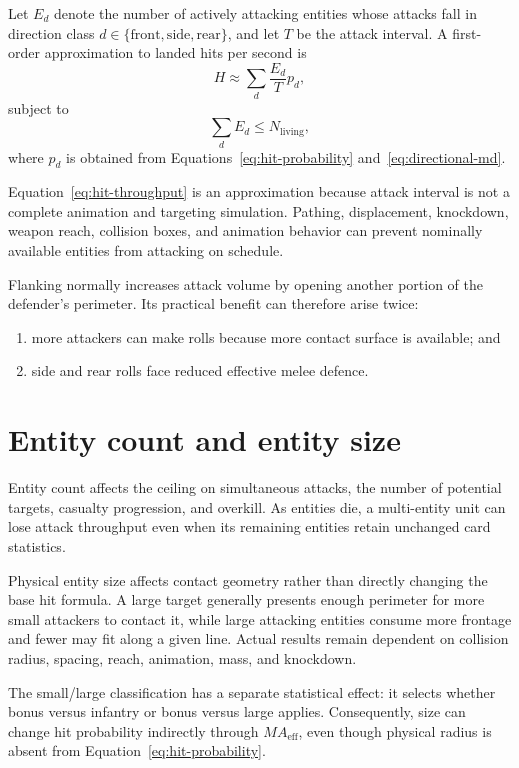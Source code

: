 \documentclass[11pt]{article}
\begin{document}
Let $E_d$ denote the number of actively attacking entities whose attacks fall
in direction class $d \in \{\mathrm{front},\mathrm{side},\mathrm{rear}\}$,
and let $T$ be the attack interval.  A first-order approximation to landed
hits per second is
\begin{equation}
  H \approx
  \sum_d \frac{E_d}{T} p_d,
  \label{eq:hit-throughput}
\end{equation}
subject to
\begin{equation}
  \sum_d E_d \leq N_{\mathrm{living}},
\end{equation}
where $p_d$ is obtained from Equations~\ref{eq:hit-probability}
and~\ref{eq:directional-md}.

Equation~\ref{eq:hit-throughput} is an approximation because attack interval
is not a complete animation and targeting simulation.  Pathing, displacement,
knockdown, weapon reach, collision boxes, and animation behavior can prevent
nominally available entities from attacking on schedule.

Flanking normally increases attack volume by opening another portion of the
defender's perimeter.  Its practical benefit can therefore arise twice:
\begin{enumerate}
  \item more attackers can make rolls because more contact surface is
        available; and
  \item side and rear rolls face reduced effective melee defence.
\end{enumerate}

\section{Entity count and entity size}

Entity count affects the ceiling on simultaneous attacks, the number of
potential targets, casualty progression, and overkill.  As entities die, a
multi-entity unit can lose attack throughput even when its remaining entities
retain unchanged card statistics.

Physical entity size affects contact geometry rather than directly changing
the base hit formula.  A large target generally presents enough perimeter for
more small attackers to contact it, while large attacking entities consume
more frontage and fewer may fit along a given line.  Actual results remain
dependent on collision radius, spacing, reach, animation, mass, and knockdown.

The small/large classification has a separate statistical effect: it selects
whether bonus versus infantry or bonus versus large applies.  Consequently,
size can change hit probability indirectly through $MA_{\mathrm{eff}}$, even
though physical radius is absent from Equation~\ref{eq:hit-probability}.
\end{document}
